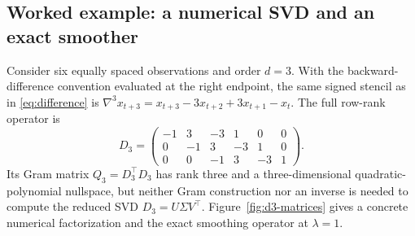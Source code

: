 \subsection{Worked example: a numerical SVD and an exact smoother}
\label{sec:d3-example}
Consider six equally spaced observations and order $d=3$.
With the backward-difference convention evaluated at the
right endpoint, the same signed stencil as in
\eqref{eq:difference} is
$\nabla^3 x_{t+3}=x_{t+3}-3x_{t+2}+3x_{t+1}-x_t$.
The full row-rank operator is
\begin{equation}\label{eq:third-order-matrices}
D_3=
\begin{pmatrix}
-1&3&-3&1&0&0\\
0&-1&3&-3&1&0\\
0&0&-1&3&-3&1
\end{pmatrix}.
\end{equation}
Its Gram matrix $Q_3=D_3^\top D_3$ has rank three
and a three-dimensional quadratic-polynomial nullspace,
but neither Gram construction nor an inverse is needed
to compute the reduced SVD $D_3=U\Sigma V^\top$.
Figure~\ref{fig:d3-matrices} gives a concrete
numerical factorization and the exact smoothing operator
at $\lambda=1$.

